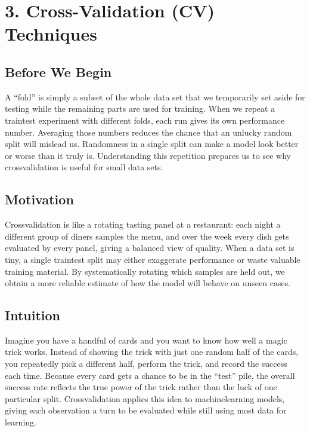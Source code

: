 \documentclass[12pt, a4paper]{article}
\begin{document}
\section{3. Cross-Validation (CV) Techniques}

\subsection{Before We Begin}
A ``fold'' is simply a subset of the whole data set that we temporarily set aside for testing while the remaining parts are used for training.  
When we repeat a traintest experiment with different folds, each run gives its own performance number.  
Averaging those numbers reduces the chance that an unlucky random split will mislead us.  
Randomness in a single split can make a model look better or worse than it truly is.  
Understanding this repetition prepares us to see why crossvalidation is useful for small data sets.  

\subsection{Motivation}
Crossvalidation is like a rotating tasting panel at a restaurant: each night a different group of diners samples the menu, and over the week every dish gets evaluated by every panel, giving a balanced view of quality.  
When a data set is tiny, a single traintest split may either exaggerate performance or waste valuable training material.  
By systematically rotating which samples are held out, we obtain a more reliable estimate of how the model will behave on unseen cases.  

\subsection{Intuition}
Imagine you have a handful of cards and you want to know how well a magic trick works.  
Instead of showing the trick with just one random half of the cards, you repeatedly pick a different half, perform the trick, and record the success each time.  
Because every card gets a chance to be in the ``test'' pile, the overall success rate reflects the true power of the trick rather than the luck of one particular split.  
Crossvalidation applies this idea to machinelearning models, giving each observation a turn to be evaluated while still using most data for learning.  
\end{document}
